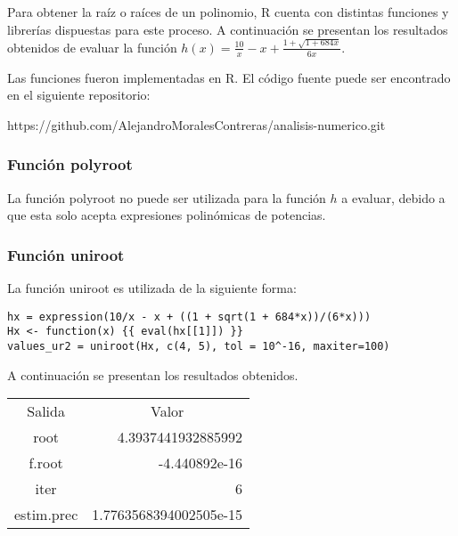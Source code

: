\documentclass[a4paper,12pt]{article}
\begin{document}
Para obtener la raíz o raíces de un polinomio, R cuenta con distintas funciones y librerías dispuestas para este proceso. A continuación se presentan los resultados obtenidos de evaluar la función $h(x)=\frac{10}{x}-x +\frac{1 + \sqrt{1 + 684 x}}{6x}$. \par 

Las funciones fueron implementadas en R. El código fuente puede ser encontrado en el siguiente repositorio: \par

\vspace{1em}
https://github.com/AlejandroMoralesContreras/analisis-numerico.git \par

\subsubsection{Función polyroot}

La función polyroot no puede ser utilizada para la función $h$ a evaluar, debido a que esta solo acepta expresiones polinómicas de potencias. \par 

\subsubsection{Función uniroot}

La función uniroot es utilizada de la siguiente forma: \par

\begin{verbatim}
hx = expression(10/x - x + ((1 + sqrt(1 + 684*x))/(6*x)))
Hx <- function(x) {{ eval(hx[[1]]) }}
values_ur2 = uniroot(Hx, c(4, 5), tol = 10^-16, maxiter=100)
\end{verbatim}

A continuación se presentan los resultados obtenidos. \par

\begin{table}[ht!]
\begin{tabular}{cr}
Salida     & \multicolumn{1}{c}{Valor}                  \\
root       & 4.3937441932885992                         \\
f.root     & -4.440892e-16                              \\
iter       & 6                                          \\
estim.prec & \multicolumn{1}{l}{1.7763568394002505e-15}
\end{tabular}
\end{table}
\end{document}

